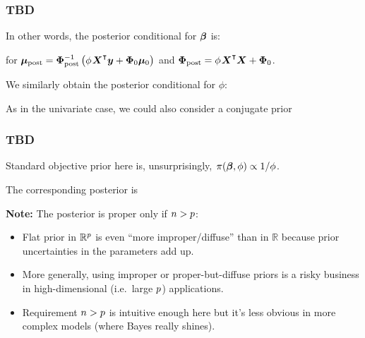 \documentclass[18pt, handout]{beamer}
\newcommand{\defineTightItemizeSpacing}{%
	\setlength{\abovedisplayskip}{.25\baselineskip}%
	\setlength{\belowdisplayskip}{.25\baselineskip}%
}
\newenvironment{tightEquation*}{%
	\defineTightItemizeSpacing%
	\begin{equation*}
}{
	\end{equation*} \ignorespacesafterend
}
\newenvironment{narrowItemize}[1][]{%
  \vspace{-.3\baselineskip}%
  \begin{itemize}[#1]
  \addtolength\itemsep{-.1\baselineskip}
}{
  \end{itemize}
}
\newcommand{\given}{\thinnerspace | \thinnerspace}
\newcommand{\transpose}{\text{\raisebox{.5ex}{$\intercal$}}}
\newcommand{\thinnerspace}{\mskip.5\thinmuskip}
\newcommand{\normalDist}{\mathcal{N}}
\newcommand{\gammaDist}{\mathrm{Gamma}}
\newcommand{\density}{\pi}
\newcommand{\bX}{\bm{X}}
\newcommand{\bmu}{\bm{\mu}}
\begin{document}
\begin{frame}
\frametitle{TBD}

In other words, the posterior conditional for $\bm{\beta}$ is:
for $\bmu_{\textrm{post}} = \bPhi_{\textrm{post}}^{-1} \left( \phi \thinnerspace \bX^\transpose \bm{y} + \bPhi_0 \bmu_0 \right)$ and $\bPhi_{\textrm{post}} = \phi \thinnerspace \bX^\transpose \bX + \bPhi_0$.

\medskip
We similarly obtain the posterior conditional for $\phi$:

As in the univariate case, we could also consider a conjugate prior
\end{frame}


\begin{frame}
\frametitle{TBD}
Standard objective prior here is, unsurprisingly, $\thinnerspace \density(\bbeta, \phi) \propto 1 / \phi$.

The corresponding posterior is
\begin{tightEquation*}
\begin{gathered}
\bbeta \given \bm{y}, \bX, \phi
	\sim \normalDist\!\left(
		 \left(  \bX^\transpose \bX \right)^{-1} \! \bX^\transpose \bm{y}, \,
		\left( \phi \bX^\transpose \bX \right)^{-1}
	\right), \\
\phi \given \bm{y}, \bX
	\sim \gammaDist\!\left( 
		\frac{n - \nPred}{2}, \thinnerspace \frac{\| \bm{y} - \bX \bbeta \|^2}{2} 
	\right).
\end{gathered}
\end{tightEquation*}

\textbf{Note:} The posterior is proper only if $n > p$:
\begin{narrowItemize}
\item Flat prior in $\mathbb{R}^p$ is even ``more improper/diffuse'' than in $\mathbb{R}$ because prior uncertainties in the parameters add up.
\item More generally, using improper or proper-but-diffuse priors is a risky business in high-dimensional (i.e.\ large $p$) applications.
\item Requirement $n > p$ is intuitive enough here but it's less obvious in more complex models (where Bayes really shines).
\end{narrowItemize}
\end{frame}
\end{document}
